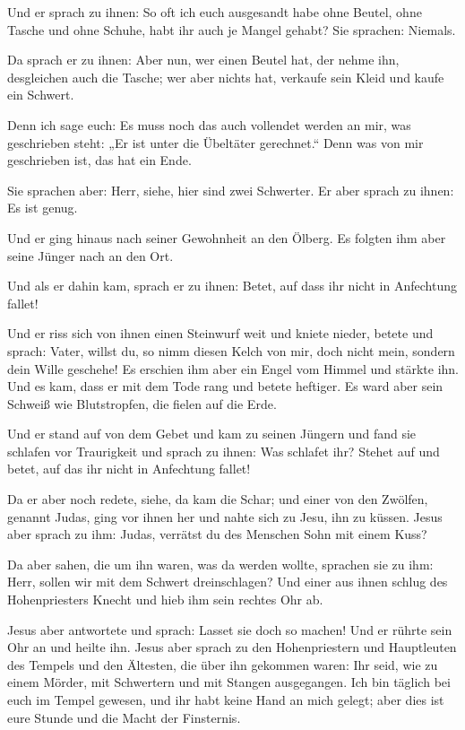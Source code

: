  Und er sprach zu ihnen: So oft ich euch ausgesandt habe
ohne Beutel, ohne Tasche und ohne Schuhe, habt ihr auch je Mangel
gehabt? Sie sprachen: Niemals.

 Da sprach er zu ihnen: Aber nun, wer einen Beutel hat,
der nehme ihn, desgleichen auch die Tasche; wer aber nichts hat,
verkaufe sein Kleid und kaufe ein Schwert.

 Denn ich sage euch: Es muss noch das auch vollendet
werden an mir, was geschrieben steht: „Er ist unter die Übeltäter
gerechnet.`` Denn was von mir geschrieben ist, das hat ein Ende.

 Sie sprachen aber: Herr, siehe, hier sind zwei
Schwerter. Er aber sprach zu ihnen: Es ist genug.

 Und er ging hinaus nach seiner Gewohnheit an den Ölberg.
Es folgten ihm aber seine Jünger nach an den Ort.

 Und als er dahin kam, sprach er zu ihnen: Betet, auf
dass ihr nicht in Anfechtung fallet!

 Und er riss sich von ihnen einen Steinwurf weit und
kniete nieder, betete  und sprach: Vater, willst du, so
nimm diesen Kelch von mir, doch nicht mein, sondern dein Wille geschehe!
 Es erschien ihm aber ein Engel vom Himmel und stärkte
ihn.  Und es kam, dass er mit dem Tode rang und betete
heftiger. Es ward aber sein Schweiß wie Blutstropfen, die fielen auf die
Erde.

 Und er stand auf von dem Gebet und kam zu seinen Jüngern
und fand sie schlafen vor Traurigkeit  und sprach zu
ihnen: Was schlafet ihr? Stehet auf und betet, auf das ihr nicht in
Anfechtung fallet!

 Da er aber noch redete, siehe, da kam die Schar; und
einer von den Zwölfen, genannt Judas, ging vor ihnen her und nahte sich
zu Jesu, ihn zu küssen.  Jesus aber sprach zu ihm: Judas,
verrätst du des Menschen Sohn mit einem Kuss?

 Da aber sahen, die um ihn waren, was da werden wollte,
sprachen sie zu ihm: Herr, sollen wir mit dem Schwert dreinschlagen?
 Und einer aus ihnen schlug des Hohenpriesters Knecht und
hieb ihm sein rechtes Ohr ab.

 Jesus aber antwortete und sprach: Lasset sie doch so
machen! Und er rührte sein Ohr an und heilte ihn.  Jesus
aber sprach zu den Hohenpriestern und Hauptleuten des Tempels und den
Ältesten, die über ihn gekommen waren: Ihr seid, wie zu einem Mörder,
mit Schwertern und mit Stangen ausgegangen.  Ich bin
täglich bei euch im Tempel gewesen, und ihr habt keine Hand an mich
gelegt; aber dies ist eure Stunde und die Macht der Finsternis.

